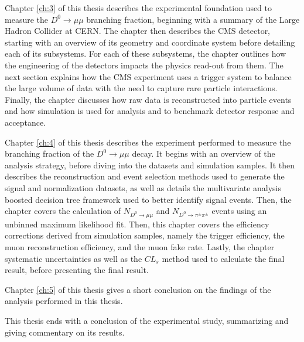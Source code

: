 Chapter \ref{ch:3} of this thesis describes the experimental foundation used to measure the $D^0 \to \mu\mu$ branching fraction, beginning with a summary of the Large Hadron Collider at CERN. The chapter then describes the CMS detector, starting with an overview of its geometry and coordinate system before detailing each of its subsystems. For each of these subsystems, the chapter outlines how the engineering of the detectors impacts the physics read-out from them. The next section explains how the CMS experiment uses a trigger system to balance the large volume of data with the need to capture rare particle interactions. Finally, the chapter discusses how raw data is reconstructed into particle events and how simulation is used for analysis and to benchmark detector response and acceptance.

Chapter \ref{ch:4} of this thesis describes the experiment performed to measure the branching fraction of the $D^0 \to \mu\mu$ decay. It begins with an overview of the analysis strategy, before diving into the datasets and simulation samples. It then describes the reconstruction and event selection methods used to generate the signal and normalization datasets, as well as details the multivariate analysis boosted decision tree framework used to better identify signal events. Then, the chapter covers the calculation of $N_{D^0 \to \mu\mu}$ and $N_{D^0 \to \pi^\pm \pi^\pm}$ events using an unbinned maximum likelihood fit. Then, this chapter covers the efficiency corrections derived from simulation samples, namely the trigger efficiency, the muon reconstruction efficiency, and the muon fake rate. Lastly, the chapter systematic uncertainties as well as the $CL_s$ method used to calculate the final result, before presenting the final result. 

Chapter \ref{ch:5} of this thesis gives a short conclusion on the findings of the analysis performed in this thesis.

This thesis ends with a conclusion of the experimental study, summarizing and giving commentary on its results. 

